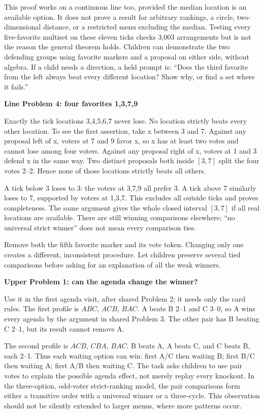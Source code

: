 \documentclass[11pt,letterpaper]{article}
\newcommand{\heading}[1]{\par\vspace{4pt}{\large\bfseries #1}\par}
\newcommand{\sub}[1]{\par\textbf{#1}\par}
\begin{document}
This proof works on a continuous line too, provided the median location is an available option. It does not prove a result for arbitrary rankings, a circle, two-dimensional distance, or a restricted menu excluding the median. Testing every five-favorite multiset on these eleven ticks checks 3,003 arrangements but is not the reason the general theorem holds. Children can demonstrate the two defending groups using favorite markers and a proposal on either side, without algebra. If a child needs a direction, a held prompt is: ``Does the third favorite from the left always beat every different location? Show why, or find a set where it fails.''
\newpage
\heading{Return investigations and the agenda continuation}
\sub{Line Problem 4: four favorites 1,3,7,9}
Exactly the tick locations 3,4,5,6,7 never lose. No location strictly beats every other location. To see the first assertion, take x between 3 and 7. Against any proposal left of x, voters at 7 and 9 favor x, so x has at least two votes and cannot lose among four voters. Against any proposal right of x, voters at 1 and 3 defend x in the same way. Two distinct proposals both inside $[3,7]$ split the four votes 2--2. Hence none of those locations strictly beats all others.

A tick below 3 loses to 3: the voters at 3,7,9 all prefer 3. A tick above 7 similarly loses to 7, supported by voters at 1,3,7. This excludes all outside ticks and proves completeness. The same argument gives the whole closed interval $[3,7]$ if all real locations are available. There are still winning comparisons elsewhere; ``no universal strict winner'' does not mean every comparison ties.

Remove both the fifth favorite marker and its vote token. Changing only one creates a different, inconsistent procedure. Let children preserve several tied comparisons before asking for an explanation of all the weak winners.

\sub{Upper Problem 1: can the agenda change the winner?}
Use it in the first agenda visit, after shared Problem 2; it needs only the card rules. The first profile is $ABC$, $ACB$, $BAC$. A beats B 2--1 and C 3--0, so A wins every agenda by the argument in shared Problem 3. The other pair has B beating C 2--1, but its result cannot remove A.

The second profile is $ACB$, $CBA$, $BAC$. B beats A, A beats C, and C beats B, each 2--1. Thus each waiting option can win: first A/C then waiting B; first B/C then waiting A; first A/B then waiting C. The task asks children to use pair votes to explain the possible agenda effect, not merely replay every knockout. In the three-option, odd-voter strict-ranking model, the pair comparisons form either a transitive order with a universal winner or a three-cycle. This observation should not be silently extended to larger menus, where more patterns occur.
\end{document}
